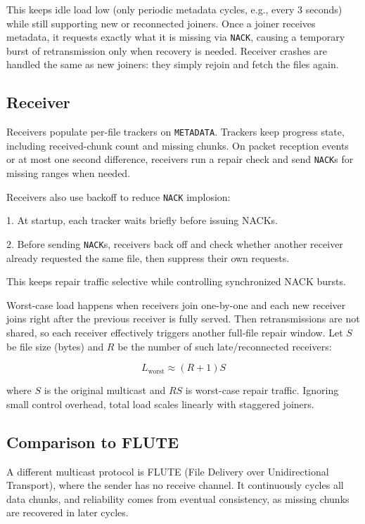 \documentclass{article}
\begin{document}
This keeps idle load low (only periodic metadata cycles, e.g., every 3 seconds) while still supporting new or reconnected joiners. Once a joiner receives metadata, it requests exactly what it is missing via \texttt{NACK}, causing a temporary burst of retransmission only when recovery is needed.
Receiver crashes are handled the same as new joiners: they simply rejoin and fetch the files again.

\subsection*{Receiver}

Receivers populate per-file trackers on \texttt{METADATA}. Trackers keep progress state, including received-chunk count and missing chunks. On packet reception events or at most one second difference, receivers run a repair check and send \texttt{NACK}s for missing ranges when needed.

Receivers also use backoff to reduce \texttt{NACK} implosion:

1. At startup, each tracker waits briefly before issuing NACKs.

2. Before sending \texttt{NACK}s, receivers back off and check whether another receiver already requested the same file, then suppress their own requests.

This keeps repair traffic selective while controlling synchronized NACK bursts.

Worst-case load happens when receivers join one-by-one and each new receiver joins right after the previous receiver is fully served. Then retransmissions are not shared, so each receiver effectively triggers another full-file repair window. Let $S$ be file size (bytes) and $R$ be the number of such late/reconnected receivers:

$$
L_{\text{worst}} \approx (R+1)S
$$

where $S$ is the original multicast and $RS$ is worst-case repair traffic. Ignoring small control overhead, total load scales linearly with staggered joiners.

\subsection*{Comparison to FLUTE}

A different multicast protocol is FLUTE (File Delivery over Unidirectional Transport), where the sender has no receive channel. It continuously cycles all data chunks, and reliability comes from eventual consistency, as missing chunks are recovered in later cycles.
\end{document}
